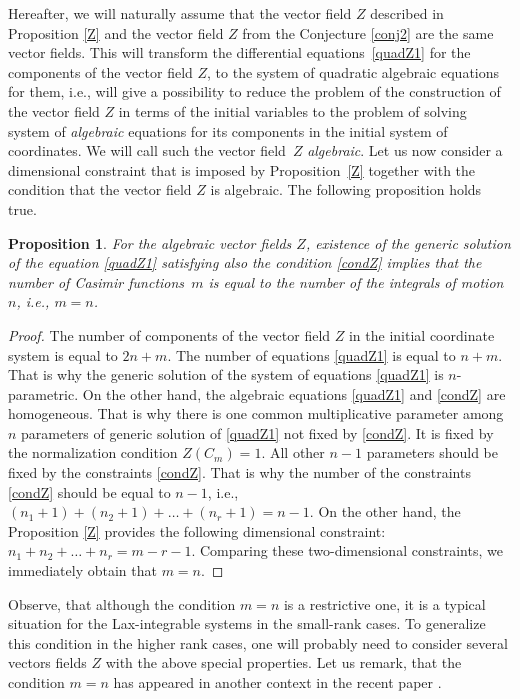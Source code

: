 \documentclass[pdftex]{sigma}
\numberwithin{equation}{section}
\newtheorem{Proposition}[Theorem]{Proposition}
\begin{document}
Hereafter, we will naturally assume that the vector field $Z$ described in Proposition \ref{Z} and the vector field $Z$ from the Conjecture \ref{conj2} are the same vector fields. This will transform the differential equations~\eqref{quadZ1} for the components of the vector field $Z$, to the system of quadratic algebraic equations for them, i.e., will give a possibility to reduce the problem of the construction of the vector field $Z$ in terms of the initial variables to the problem of solving system of {\it algebraic} equations for its components in the initial system of coordinates. We will call such the vector field~$Z$ {\it algebraic}.
Let us now consider a dimensional constraint that is imposed by Proposition~\ref{Z} together with the condition that the vector field $Z$ is algebraic.
The following proposition holds true.
\begin{Proposition}
For the algebraic vector fields $Z$, existence of the generic solution of the equation \eqref{quadZ1} satisfying also the condition \eqref{condZ} implies that the number of Casimir functions~$m$ is equal to the number of the integrals of motion $n$, i.e., $m=n$.
\end{Proposition}

\begin{proof}
 The number of components of the vector field $Z$ in the initial coordinate system is equal to $2n+m$. The number of equations \eqref{quadZ1} is equal to $n+m$. That is why the generic solution of the system of equations \eqref{quadZ1} is $n$-parametric. On the other hand, the algebraic equations \eqref{quadZ1} and \eqref{condZ} are homogeneous. That is why there is one common multiplicative parameter among $n$ parameters of generic solution of \eqref{quadZ1} not fixed by \eqref{condZ}. It is fixed by the normalization condition $Z(C_m)=1$. All other $n-1$ parameters should be fixed by the constraints \eqref{condZ}. That is why the number of the constraints \eqref{condZ} should be equal to $n-1$, i.e., $(n_1+1)+ (n_2+1)+ \dots +(n_r+1)=n-1$. On the other hand, the Proposition \ref{Z} provides the following dimensional constraint: $n_1+n_2+ \dots +n_r=m-r-1$.
Comparing these two-dimensional constraints, we immediately obtain that $m=n$.
\end{proof}

\begin{Remark}
 Observe, that although the condition $m=n$ is a restrictive one, it is a typical situation for the Lax-integrable systems in the small-rank cases. To generalize this condition in the higher rank cases, one will probably need to consider several vectors fields $Z$ with the above special properties. Let us remark, that the condition $m=n$ has appeared in another context in the recent paper \cite{BlaMar}.
\end{Remark}
\end{document}
